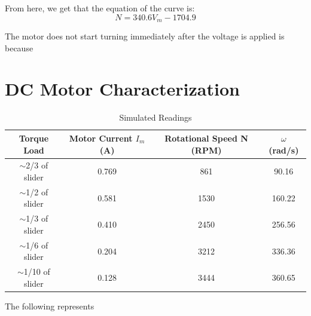 \documentclass[a4paper,12pt,oneside, tikz]{book}
\begin{document}
From here, we get that the equation of the curve is:
$$N = 340.6V_m - 1704.9$$

The motor does not start turning immediately after the voltage is applied is because 

\chapter{DC Motor Characterization}
\begin{table}[H]
    \centering
    \begin{tabular}{|c|c|c|c|}
         \hline Torque Load & Motor Current $I_m$ (A) & Rotational Speed N (RPM) & $\omega$ (rad/s)  \\
         \hline $\sim$2/3 of slider & 0.769 & 861 & 90.16 \\
         $\sim$1/2 of slider & 0.581 & 1530 & 160.22 \\
         $\sim$1/3 of slider & 0.410 & 2450 & 256.56 \\
         $\sim$1/6 of slider & 0.204 & 3212 & 336.36 \\
         $\sim$1/10 of slider & 0.128 & 3444 & 360.65 \\
         \hline
    \end{tabular}
    \caption{Simulated Readings}
    \label{tab:activity2}
\end{table}

The following represents
\end{document}
